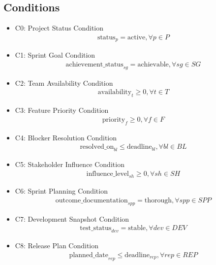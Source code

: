 \documentclass{article}
\begin{document}
\begin{itemize}
\section{Conditions}
\begin{itemize}
    \item C0: Project Status Condition
        \begin{align*}
            \text{status}_p = \text{active}, \forall p \in P
        \end{align*}
    \item C1: Sprint Goal Condition
        \begin{align*}
            \text{achievement\_status}_{sg} = \text{achievable}, \forall sg \in SG
        \end{align*}
    \item C2: Team Availability Condition
        \begin{align*}
            \text{availability}_t \geq 0, \forall t \in T
        \end{align*}
    \item C3: Feature Priority Condition
        \begin{align*}
            \text{priority}_f \geq 0, \forall f \in F
        \end{align*}
    \item C4: Blocker Resolution Condition
        \begin{align*}
            \text{resolved\_on}_{bl} \leq \text{deadline}_{bl}, \forall bl \in BL
        \end{align*}
    \item C5: Stakeholder Influence Condition
        \begin{align*}
            \text{influence\_level}_{sh} \geq 0, \forall sh \in SH
        \end{align*}
    \item C6: Sprint Planning Condition
        \begin{align*}
            \text{outcome\_documentation}_{spp} = \text{thorough}, \forall spp \in SPP
        \end{align*}
    \item C7: Development Snapshot Condition
        \begin{align*}
            \text{test\_status}_{dev} = \text{stable}, \forall dev \in DEV
        \end{align*}
    \item C8: Release Plan Condition
        \begin{align*}
            \text{planned\_date}_{rep} \leq \text{deadline}_{rep}, \forall rep \in REP

\end{align*}
\end{itemize}
\end{itemize}
\end{document}
